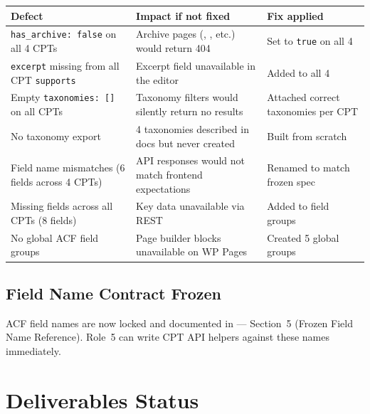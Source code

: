 \documentclass[12pt,a4paper]{article}
\begin{document}
\begin{longtable}{@{}L{4.2cm}L{4.8cm}L{4.2cm}@{}}
\toprule
{}
\textbf{Defect} & \textbf{Impact if not fixed} & \textbf{Fix applied} \\
\midrule
\endhead
\texttt{has\_archive: false} on all 4 CPTs
    & Archive pages (, , etc.) would return 404
    & Set to \texttt{true} on all 4 \\
\addlinespace
\texttt{excerpt} missing from all CPT \texttt{supports}
    & Excerpt field unavailable in the editor
    & Added to all 4 \\
\addlinespace
Empty \texttt{taxonomies: []} on all CPTs
    & Taxonomy filters would silently return no results
    & Attached correct taxonomies per CPT \\
\addlinespace
No taxonomy export
    & 4 taxonomies described in docs but never created
    & Built  from scratch \\
\addlinespace
Field name mismatches (6 fields across 4 CPTs)
    & API responses would not match frontend expectations
    & Renamed to match frozen spec \\
\addlinespace
Missing fields across all CPTs (8 fields)
    & Key data unavailable via REST
    & Added to field groups \\
\addlinespace
No global ACF field groups
    & Page builder blocks unavailable on WP Pages
    & Created 5 global groups \\
\bottomrule
\end{longtable}

\subsection{Field Name Contract Frozen}

ACF field names are now locked and documented in
 ---
Section~5 (Frozen Field Name Reference).
Role~5 can write CPT API helpers against these names immediately.

\section{Deliverables Status}
\end{document}
